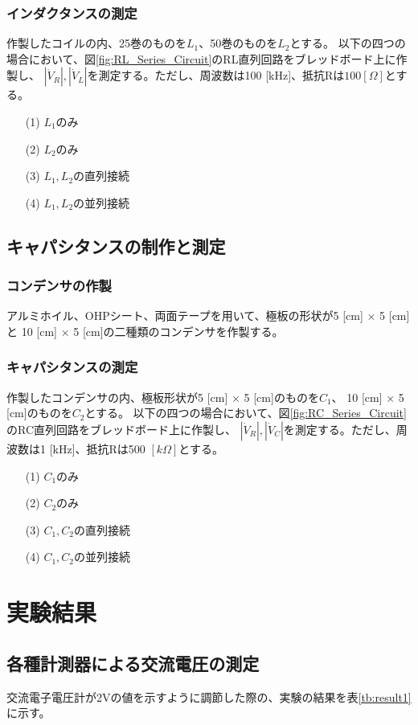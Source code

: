 \documentclass[dvipdfmx]{jsarticle}
\begin{document}
\subsubsection{インダクタンスの測定}
作製したコイルの内、25巻のものを$L_1$、50巻のものを$L_2$とする。
以下の四つの場合において、図\ref{fig:RL_Series_Circuit}のRL直列回路をブレッドボード上に作製し、
$|\dot V_R|, |\dot V_L|$を測定する。ただし、周波数は100 [kHz]、抵抗Rは$100 [\Omega]$とする。
\begin{itemize}
  \item [(1)]$L_1$のみ
  \item [(2)]$L_2$のみ
  \item [(3)]$L_1, L_2$の直列接続
  \item [(4)]$L_1, L_2$の並列接続
\end{itemize}
\subsection{キャパシタンスの制作と測定}
\subsubsection{コンデンサの作製}
アルミホイル、OHPシート、両面テープを用いて、極板の形状が5 [cm] $\times$ 5 [cm]と
10 [cm] $\times$ 5 [cm]の二種類のコンデンサを作製する。
\subsubsection{キャパシタンスの測定}
作製したコンデンサの内、極板形状が5 [cm] $\times$ 5 [cm]のものを$C_1$、
10 [cm] $\times$ 5 [cm]のものを$C_2$とする。
以下の四つの場合において、図\ref{fig:RC_Series_Circuit}のRC直列回路をブレッドボード上に作製し、
$|\dot V_R|, |\dot V_C|$を測定する。ただし、周波数は1 [kHz]、抵抗Rは500 $[k\Omega]$とする。
\begin{itemize}
  \item [(1)]$C_1$のみ
  \item [(2)]$C_2$のみ
  \item [(3)]$C_1, C_2$の直列接続
  \item [(4)]$C_1, C_2$の並列接続
\end{itemize}

\section{実験結果}
\subsection{各種計測器による交流電圧の測定}
交流電子電圧計が2Vの値を示すように調節した際の、実験の結果を表\ref{tb:result1}に示す。
\end{document}
